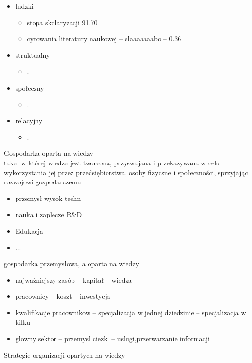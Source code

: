 \documentclass[a4paper,10pt]{report}
\begin{document}
\begin{itemize}
	\item ludzki
	\begin{itemize}
		\item stopa skolaryzacji 91.70 
		\item cytowania literatury naukowej -- słaaaaaaabo -- 0.36
	\end{itemize}
	\item struktualny
	\begin{itemize}
		\item .
	\end{itemize}
	\item społeczny
	\begin{itemize}
		\item .
	\end{itemize}	
	\item relacyjny
	\begin{itemize}
		\item .
	\end{itemize}	
\end{itemize}

Gospodarka oparta na wiedzy\\
taka, w której wiedza jest tworzona, przyswajana i przekazywana w celu wykorzystania jej przez przedsiębiorstwa, osoby fizyczne i społeczności, sprzyjając rozwojowi gospodarczemu\\

\begin{itemize}
	\item przemysł wysok techn
	\item nauka i zaplecze R\&D
	\item Edukacja
	\item ...
	
\end{itemize}

gospodarka przemysłowa, a oparta na wiedzy
\begin{itemize}
	\item najważniejszy zasób -- kapitał -- wiedza
	\item pracownicy -- koszt -- inwestycja
	\item kwalifikacje pracownikow -- specjalizacja w jednej dziedzinie -- specjalizacja w kilku
	\item glowny sektor -- przemysl ciezki -- uslugi,przetwarzanie informacji
\end{itemize}

Strategie organizacji opartych na wiedzy
\end{document}

